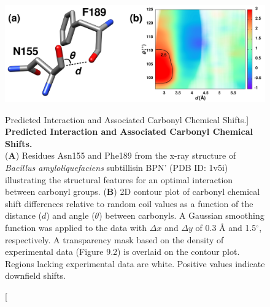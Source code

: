 \begin{figure}[ht!]
\includegraphics[width=6.5in]{figs/npistar/01.png}
\caption
      [Predicted \npistar{} Interaction and Associated Carbonyl \cnmr{}
       Chemical Shifts.]{
  {\bf Predicted \npistar{} Interaction and Associated Carbonyl \cnmr{}
       Chemical Shifts.
  }
  \\
  ({\bf A}) Residues Asn155 and Phe189 from the x-ray structure of
  \emph{Bacillus amyloliquefaciens} subtillisin BPN' (PDB ID: 1v5i)
  illustrating the structural features for an optimal \npistar{} interaction
  between carbonyl groups.
  ({\bf B}) 2D contour plot of carbonyl \cnmr{} chemical shift differences
  relative to random coil values as a function of the distance ($d$) and
  angle ($\theta$) between carbonyls. A Gaussian smoothing function was
  applied to the data with $\Delta x$ and $\Delta y$ of 0.3 \r{A} and
  1.5$^\circ$, respectively. A transparency mask based on the density of
  experimental data (Figure 9.2) is overlaid on the
  contour plot. Regions lacking experimental data are white.
  Positive values indicate downfield shifts.
}
\end{figure}

